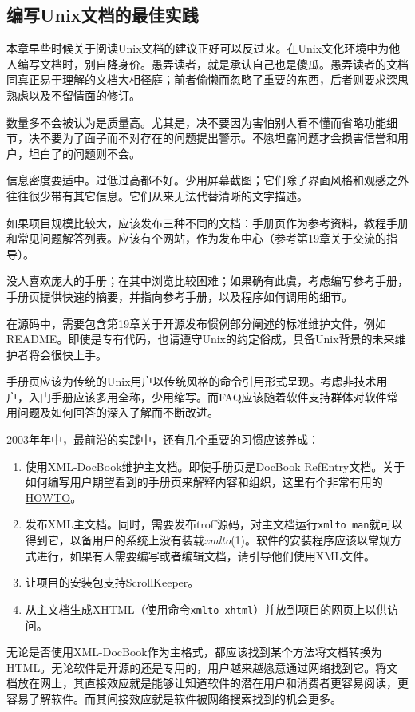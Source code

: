 \documentclass[12pt,oneside]{book}
\begin{document}
\begin{common-format}
\section{编写Unix文档的最佳实践}
本章早些时候关于阅读Unix文档的建议正好可以反过来。在Unix文化环境中为他人编写文档时，别自降身价。愚弄读者，就是承认自己也是傻瓜。愚弄读者的文档同真正易于理解的文档大相径庭；前者偷懒而忽略了重要的东西，后者则要求深思熟虑以及不留情面的修订。

数量多不会被认为是质量高。尤其是，决不要因为害怕别人看不懂而省略功能细节，决不要为了面子而不对存在的问题提出警示。不愿坦露问题才会损害信誉和用户，坦白了的问题则不会。

信息密度要适中。过低过高都不好。少用屏幕截图；它们除了界面风格和观感之外往往很少带有其它信息。它们从来无法代替清晰的文字描述。

如果项目规模比较大，应该发布三种不同的文档：手册页作为参考资料，教程手册和常见问题解答列表。应该有个网站，作为发布中心（参考第19章关于交流的指导）。

没人喜欢庞大的手册；在其中浏览比较困难；如果确有此虞，考虑编写参考手册，手册页提供快速的摘要，并指向参考手册，以及程序如何调用的细节。

在源码中，需要包含第19章关于开源发布惯例部分阐述的标准维护文件，例如README。即使是专有代码，也请遵守Unix的约定俗成，具备Unix背景的未来维护者将会很快上手。

手册页应该为传统的Unix用户以传统风格的命令引用形式呈现。考虑非技术用户，入门手册应该多用全称，少用缩写。而FAQ应该随着软件支持群体对软件常用问题及如何回答的深入了解而不断改进。

2003年年中，最前沿的实践中，还有几个重要的习惯应该养成：
\begin{enumerate}
\item 使用XML-DocBook维护主文档。即使手册页是DocBook RefEntry文档。关于如何编写用户期望看到的手册页来解释内容和组织，这里有个非常有用的\href{http://www.tldp.org/HOWTO/mini/Man-Page.html}{HOWTO}。
\item 发布XML主文档。同时，需要发布troff源码，对主文档运行\verb+xmlto man+就可以得到它，以备用户的系统上没有装载\textit{xmlto}(1)。软件的安装程序应该以常规方式进行，如果有人需要编写或者编辑文档，请引导他们使用XML文件。
\item 让项目的安装包支持ScrollKeeper。
\item 从主文档生成XHTML（使用命令\verb+xmlto xhtml+）并放到项目的网页上以供访问。
\end{enumerate}

无论是否使用XML-DocBook作为主格式，都应该找到某个方法将文档转换为HTML。无论软件是开源的还是专用的，用户越来越愿意通过网络找到它。将文档放在网上，其直接效应就是能够让知道软件的潜在用户和消费者更容易阅读，更容易了解软件。而其间接效应就是软件被网络搜索找到的机会更多。


\end{common-format}
\end{document}
